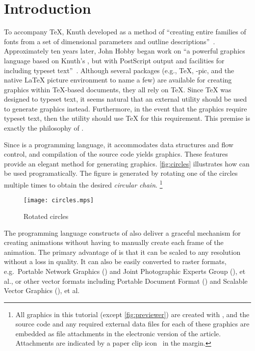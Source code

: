 \section{Introduction}
\label{sec:introduction}

To accompany \TeX{}, Knuth developed \MF{} as a method of ``creating
entire families of fonts from a set of dimensional parameters and
outline descriptions''~\cite{beebe:mf}.  Approximately ten years later,
John Hobby began work on \MP{}\Dash ``a powerful graphics language based
on Knuth's \MF, but with PostScript output and facilities for including
typeset text''~\cite{hobby:user}.  Although several packages (e.g.,
\PiC\TeX, \Xy-pic, and the native \LaTeX{} picture environment to name a
few) are available for creating graphics within \TeX-based documents,
they all rely on \TeX{}.  Since \TeX{} was designed to typeset text, it
seems natural that an external utility should be used to generate
graphics instead.  Furthermore, in the event that the graphics require
typeset text, then the utility should use \TeX{} for this requirement.
This premise is exactly the philosophy of \MP.

Since \MP{} is a programming language, it accommodates data structures
and flow control, and compilation of the \MP{} source code yields \EPS{}
graphics.  These features provide an elegant method for generating
graphics.  \autoref{fig:circles} illustrates how \MP{} can be used
programatically.  The figure is generated by rotating one of the circles
multiple times to obtain the desired \textit{circular chain}.%
\footnote{All graphics in this tutorial (except \autoref{fig:previewer})
  are created with \MP{}, and the source code and any required external
  data files for each of these graphics are embedded as file attachments
  in the electronic \PDF{} version of the article.  Attachments are
  indicated by a paper clip icon~\resizebox{!}{9pt}{\noattachfile} in
  the margin.}

\begin{figure}
  \centering
  \texttt{[image: circles.mps]}
  \caption{Rotated circles}
  \label{fig:circles}
\end{figure}

The programming language constructs of \MP{} also deliver a graceful
mechanism for creating animations without having to manually create each
frame of the animation.  The primary advantage of \EPS{} is that it can
be scaled to any resolution without a loss in quality.  It can also be
easily converted to raster formats, e.g.\ Portable Network Graphics
(\PNG) and Joint Photographic Experts Group (\JPEG), et al., or other
vector formats including Portable Document Format (\PDF) and Scalable
Vector Graphics (\SVG), et al.
